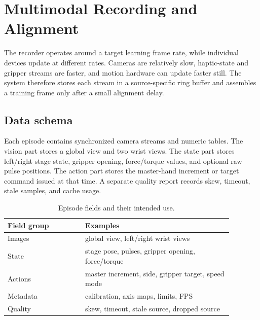 \documentclass[10pt,twocolumn,letterpaper]{article}
\begin{document}
\section{Multimodal Recording and Alignment}
The recorder operates around a target learning frame rate, while
individual devices update at different rates. Cameras are relatively
slow, haptic-state and gripper streams are faster, and motion hardware
can update faster still. The system therefore stores each stream in a
source-specific ring buffer and assembles a training frame only after a
small alignment delay.

\subsection{Data schema}
Each episode contains synchronized camera streams and numeric tables.
The vision part stores a global view and two wrist views. The state part
stores left/right stage state, gripper opening, force/torque values, and
optional raw pulse positions. The action part stores the master-hand
increment or target command issued at that time. A separate quality
report records skew, timeout, stale samples, and cache usage.

\begin{table}[t]
  \centering
  \footnotesize
  \caption{Episode fields and their intended use.}
  \label{tab:episode}
  \begin{tabular}{@{}L{0.30\linewidth}L{0.58\linewidth}@{}}
    \toprule
    Field group & Examples \\
    \midrule
    Images & global view, left/right wrist views \\
    State & stage pose, pulses, gripper opening, force/torque \\
    Actions & master increment, side, gripper target, speed mode \\
    Metadata & calibration, axis maps, limits, FPS \\
    Quality & skew, timeout, stale source, dropped source \\
    \bottomrule
  \end{tabular}
\end{table}
\end{document}
